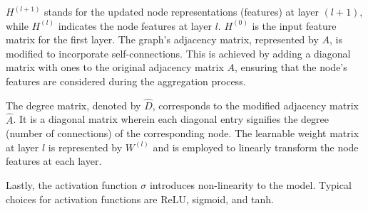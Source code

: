 $H^{(l+1)}$ stands for the updated node representations (features) at layer $(l+1)$, while $H^{(l)}$ indicates the node features at layer $l$. $H^{(0)}$ is the input feature matrix for the first layer. The graph's adjacency matrix, represented by $A$, is modified to incorporate self-connections. This is achieved by adding a diagonal matrix with ones to the original adjacency matrix $A$, ensuring that the node's features are considered during the aggregation process.

The degree matrix, denoted by $\hat{D}$, corresponds to the modified adjacency matrix $\hat{A}$. It is a diagonal matrix wherein each diagonal entry signifies the degree (number of connections) of the corresponding node. The learnable weight matrix at layer $l$ is represented by $W^{(l)}$ and is employed to linearly transform the node features at each layer.

Lastly, the activation function $\sigma$ introduces non-linearity to the model. Typical choices for activation functions are ReLU, sigmoid, and tanh.




